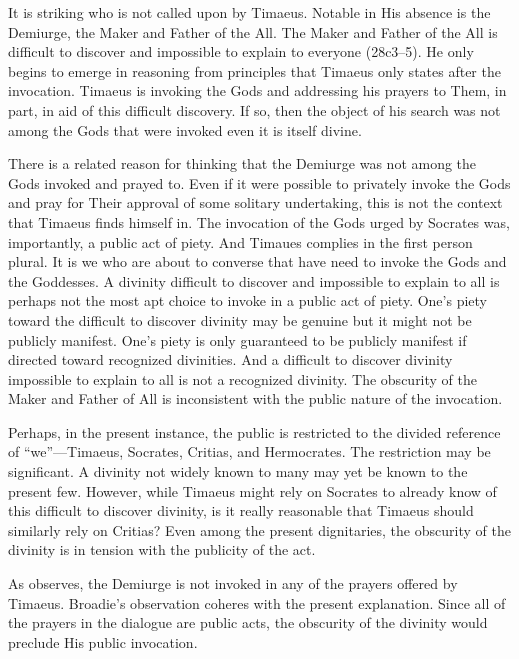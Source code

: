 It is striking who is not called upon by Timaeus. Notable in His absence is the Demiurge, the Maker and Father of the All. The Maker and Father of the All is difficult to discover and impossible to explain to everyone (28c3–5). He only begins to emerge in reasoning from principles that Timaeus only states after the invocation. Timaeus is invoking the Gods and addressing his prayers to Them, in part, in aid of this difficult discovery. If so, then the object of his search was not among the Gods that were invoked even it is itself divine.

There is a related reason for thinking that the Demiurge was not among the Gods invoked and prayed to. Even if it were possible to privately invoke the Gods and pray for Their approval of some solitary undertaking, this is not the context that Timaeus finds himself in. The invocation of the Gods urged by Socrates was, importantly, a public act of piety. And Timaues complies in the first person plural. It is we who are about to converse that have need to invoke the Gods and the Goddesses. A divinity difficult to discover and impossible to explain to all is perhaps not the most apt choice to invoke in a public act of piety. One's piety toward the difficult to discover divinity may be genuine but it might not be publicly manifest. One's piety is only guaranteed to be publicly manifest if directed toward recognized divinities. And a difficult to discover divinity impossible to explain to all is not a recognized divinity. The obscurity of the Maker and Father of All is inconsistent with the public nature of the invocation.

Perhaps, in the present instance, the public is restricted to the divided reference of ``we''---Timaeus, Socrates, Critias, and Hermocrates. The restriction may be significant. A divinity not widely known to many may yet be known to the present few. However, while Timaeus might rely on Socrates to already know of this difficult to discover divinity, is it really reasonable that Timaeus should similarly rely on Critias? Even among the present dignitaries, the obscurity of the divinity is in tension with the publicity of the act.

As \citet[13--4]{Broadie:2012vl} observes, the Demiurge is not invoked in any of the prayers offered by Timaeus. Broadie's observation coheres with the present explanation. Since all of the prayers in the dialogue are public acts, the obscurity of the divinity would preclude His public invocation.

